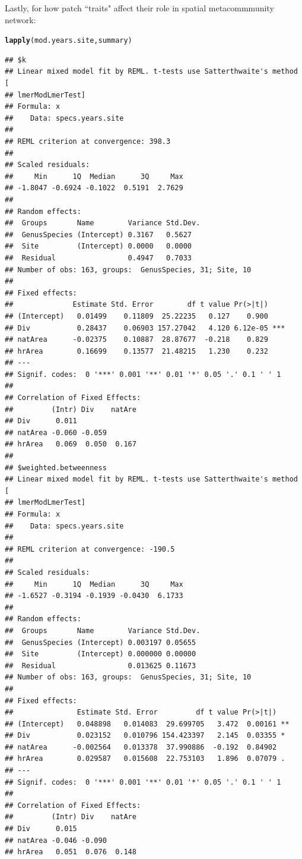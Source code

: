 \documentclass{article}\usepackage[]{graphicx}\usepackage[]{color}
\makeatletter
\newcommand{\hlstd}[1]{\textcolor[rgb]{0.345,0.345,0.345}{#1}}%
\newcommand{\hlkwd}[1]{\textcolor[rgb]{0.737,0.353,0.396}{\textbf{#1}}}%
\newenvironment{kframe}{%
 \def\at@end@of@kframe{}%
 \ifinner\ifhmode%
  \def\at@end@of@kframe{\end{minipage}}%
  \begin{minipage}{\columnwidth}%
 \fi\fi%
 \def\FrameCommand##1{\hskip\@totalleftmargin \hskip-\fboxsep
 \colorbox{shadecolor}{##1}\hskip-\fboxsep
     \hskip-\linewidth \hskip-\@totalleftmargin \hskip\columnwidth}%
 \MakeFramed {\advance\hsize-\width
   \@totalleftmargin\z@ \linewidth\hsize
   \@setminipage}}%
 {\par\unskip\endMakeFramed%
 \at@end@of@kframe}
\newenvironment{knitrout}{}{} %
\makeatother
\begin{document}
Lastly, for how patch ``traits" affect their role in spatial  metacommmunity network: 
\begin{knitrout}
\color{fgcolor}\begin{kframe}
\begin{alltt}
\hlkwd{lapply}\hlstd{(mod.years.site, summary)}
\end{alltt}
\begin{verbatim}
## $k
## Linear mixed model fit by REML. t-tests use Satterthwaite's method [
## lmerModLmerTest]
## Formula: x
##    Data: specs.years.site
## 
## REML criterion at convergence: 398.3
## 
## Scaled residuals: 
##     Min      1Q  Median      3Q     Max 
## -1.8047 -0.6924 -0.1022  0.5191  2.7629 
## 
## Random effects:
##  Groups       Name        Variance Std.Dev.
##  GenusSpecies (Intercept) 0.3167   0.5627  
##  Site         (Intercept) 0.0000   0.0000  
##  Residual                 0.4947   0.7033  
## Number of obs: 163, groups:  GenusSpecies, 31; Site, 10
## 
## Fixed effects:
##              Estimate Std. Error        df t value Pr(>|t|)    
## (Intercept)   0.01499    0.11809  25.22235   0.127    0.900    
## Div           0.28437    0.06903 157.27042   4.120 6.12e-05 ***
## natArea      -0.02375    0.10887  28.87677  -0.218    0.829    
## hrArea        0.16699    0.13577  21.48215   1.230    0.232    
## ---
## Signif. codes:  0 '***' 0.001 '**' 0.01 '*' 0.05 '.' 0.1 ' ' 1
## 
## Correlation of Fixed Effects:
##         (Intr) Div    natAre
## Div      0.011              
## natArea -0.060 -0.059       
## hrArea   0.069  0.050  0.167
## 
## $weighted.betweenness
## Linear mixed model fit by REML. t-tests use Satterthwaite's method [
## lmerModLmerTest]
## Formula: x
##    Data: specs.years.site
## 
## REML criterion at convergence: -190.5
## 
## Scaled residuals: 
##     Min      1Q  Median      3Q     Max 
## -1.6527 -0.3194 -0.1939 -0.0430  6.1733 
## 
## Random effects:
##  Groups       Name        Variance Std.Dev.
##  GenusSpecies (Intercept) 0.003197 0.05655 
##  Site         (Intercept) 0.000000 0.00000 
##  Residual                 0.013625 0.11673 
## Number of obs: 163, groups:  GenusSpecies, 31; Site, 10
## 
## Fixed effects:
##               Estimate Std. Error         df t value Pr(>|t|)   
## (Intercept)   0.048898   0.014083  29.699705   3.472  0.00161 **
## Div           0.023152   0.010796 154.423397   2.145  0.03355 * 
## natArea      -0.002564   0.013378  37.990886  -0.192  0.84902   
## hrArea        0.029587   0.015608  22.753103   1.896  0.07079 . 
## ---
## Signif. codes:  0 '***' 0.001 '**' 0.01 '*' 0.05 '.' 0.1 ' ' 1
## 
## Correlation of Fixed Effects:
##         (Intr) Div    natAre
## Div      0.015              
## natArea -0.046 -0.090       
## hrArea   0.051  0.076  0.148
\end{verbatim}
\end{kframe}
\end{knitrout}
\end{document}
